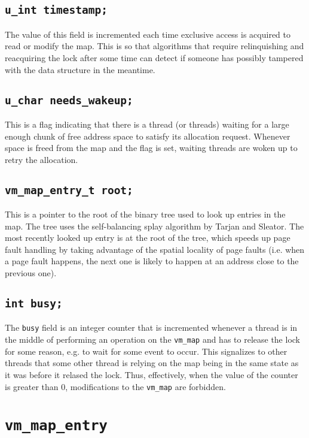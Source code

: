 \documentclass[shortabstract, english]{iithesis}
\begin{document}
\subsection*{\texttt{u_int timestamp;}}
The value of this field is incremented each time exclusive access is acquired to
read or modify the map. This is so that algorithms that require relinquishing
and reacquiring the lock after some time can detect if someone has possibly
tampered with the data structure in the meantime.

\subsection*{\texttt{u_char needs_wakeup;}}
This is a flag indicating that there is a thread (or threads) waiting for a
large enough chunk of free address space to satisfy its allocation request.
Whenever space is freed from the map and the flag is set, waiting threads are
woken up to retry the allocation.

\subsection*{\texttt{vm_map_entry_t root;}}
This is a pointer to the root of the binary tree used to look up entries in the
map. The tree uses the self-balancing splay algorithm by Tarjan and Sleator. The
most recently looked up entry is at the root of the tree, which speeds up page
fault handling by taking advantage of the spatial locality of page faults (i.e.
when a page fault happens, the next one is likely to happen at an address close
to the previous one).

\subsection*{\texttt{int busy;}}
The \texttt{busy} field is an integer counter that is incremented whenever a
thread is in the middle of performing an operation on the \texttt{vm_map} and
has to release the lock for some reason, e.g. to wait for some event to occur.
This signalizes to other threads that some other thread is relying on the map
being in the same state as it was before it relased the lock. Thus, effectively,
when the value of the counter is greater than 0, modifications to the
\texttt{vm_map} are forbidden.

\section{\texttt{vm_map_entry}}
\end{document}
